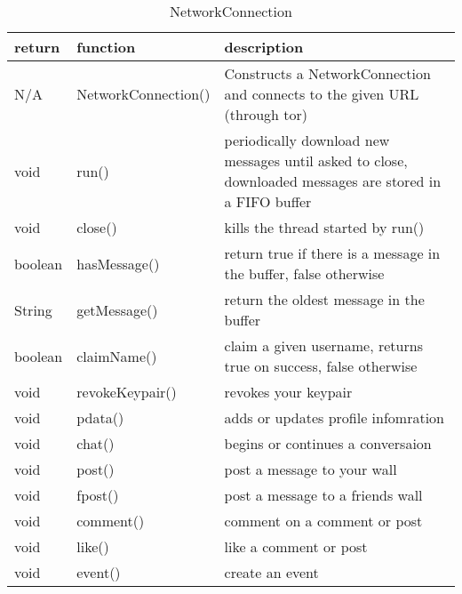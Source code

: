 \begin{table}[h]
    \centering
    \begin{tabular}{p{1cm}p{2.8cm}p{9cm}}
    return   & function            & description\\ \hline
    N/A      & NetworkConnection() & Constructs a NetworkConnection and connects to the given URL (through tor)\\
    void     & run()               & periodically download new messages until asked to close, downloaded messages are stored in a FIFO buffer\\
    void     & close()             & kills the thread started by run()\\
    boolean  & hasMessage()        & return true if there is a message in the buffer, false otherwise\\
    String   & getMessage()        & return the oldest message in the buffer\\
    
    boolean  & claimName()     & claim a given username, returns true on success, false otherwise\\
    void     & revokeKeypair() & revokes your keypair\\
    void     & pdata()         & adds or updates profile infomration\\
    void     & chat()          & begins or continues a conversaion\\
    void     & post()          & post a message to your wall\\
    void     & fpost()         & post a message to a friends wall\\
    void     & comment()       & comment on a comment or post\\
    void     & like()          & like a comment or post\\
    void     & event()         & create an event\\
    \end{tabular}
    \caption{NetworkConnection}
\end{table}

